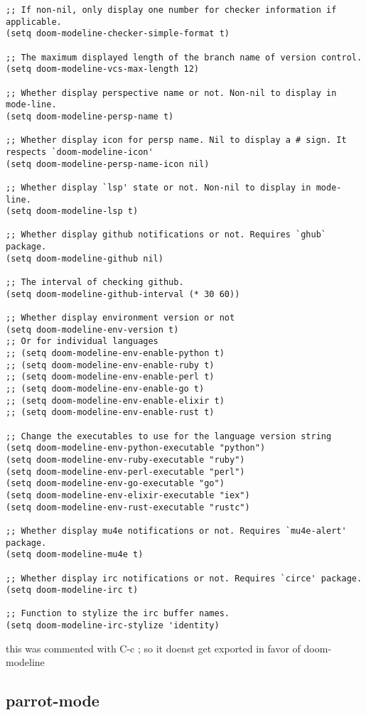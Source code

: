 \documentclass[11pt]{article}
\begin{document}
\begin{verbatim}
;; If non-nil, only display one number for checker information if applicable.
(setq doom-modeline-checker-simple-format t)

;; The maximum displayed length of the branch name of version control.
(setq doom-modeline-vcs-max-length 12)

;; Whether display perspective name or not. Non-nil to display in mode-line.
(setq doom-modeline-persp-name t)

;; Whether display icon for persp name. Nil to display a # sign. It respects `doom-modeline-icon'
(setq doom-modeline-persp-name-icon nil)

;; Whether display `lsp' state or not. Non-nil to display in mode-line.
(setq doom-modeline-lsp t)

;; Whether display github notifications or not. Requires `ghub` package.
(setq doom-modeline-github nil)

;; The interval of checking github.
(setq doom-modeline-github-interval (* 30 60))

;; Whether display environment version or not
(setq doom-modeline-env-version t)
;; Or for individual languages
;; (setq doom-modeline-env-enable-python t)
;; (setq doom-modeline-env-enable-ruby t)
;; (setq doom-modeline-env-enable-perl t)
;; (setq doom-modeline-env-enable-go t)
;; (setq doom-modeline-env-enable-elixir t)
;; (setq doom-modeline-env-enable-rust t)

;; Change the executables to use for the language version string
(setq doom-modeline-env-python-executable "python")
(setq doom-modeline-env-ruby-executable "ruby")
(setq doom-modeline-env-perl-executable "perl")
(setq doom-modeline-env-go-executable "go")
(setq doom-modeline-env-elixir-executable "iex")
(setq doom-modeline-env-rust-executable "rustc")

;; Whether display mu4e notifications or not. Requires `mu4e-alert' package.
(setq doom-modeline-mu4e t)

;; Whether display irc notifications or not. Requires `circe' package.
(setq doom-modeline-irc t)

;; Function to stylize the irc buffer names.
(setq doom-modeline-irc-stylize 'identity)
\end{verbatim}


this was commented with C-c ; so it doenst get exported in favor of doom-modeline
\subsection*{parrot-mode}
\label{sec:org43a924b}
\end{document}
